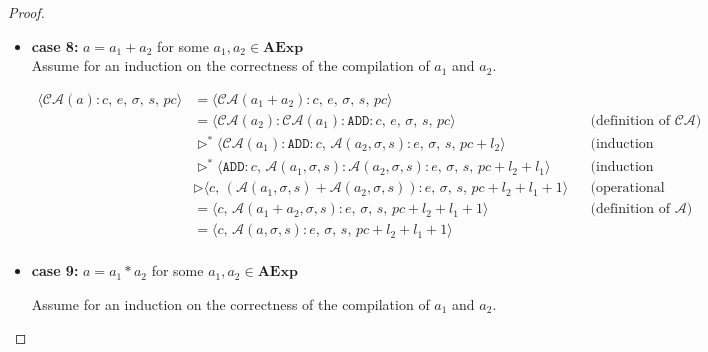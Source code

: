 \documentclass{article}
\begin{document}
\begin{proof}
\begin{itemize}
    \item \textbf{case 8: } $a = a_1 + a_2$ for some $a_1, a_2 \in \textbf{AExp}$ \\

    Assume for an induction on the correctness of the compilation of $a_1$ and $a_2$.

    \[
      \begin{aligned}
        \langle  \mathcal{CA}(a) : c,\, e,\, \sigma,\, s,\, pc \rangle 
        &= \langle \mathcal{CA}(a_1 + a_2) : c,\, e,\, \sigma,\, s,\, pc \rangle \\
        &= \langle \mathcal{CA}(a_2) : \mathcal{CA}(a_1) : \texttt{ADD} :  c,\, e,\, \sigma,\, s,\, pc \rangle 
        && \text{(definition of $\mathcal{CA}$)} \\
        &\triangleright^{\ast} \langle \mathcal{CA}(a_1) : \texttt{ADD} :  c,\, \mathcal{A}(a_2, \sigma, s) : e,\, \sigma,\, s,\, pc + l_2 \rangle 
        && \text{(induction hypothesis 2)} \\
        &\triangleright^{\ast} \langle \texttt{ADD} :  c,\, \mathcal{A}(a_1, \sigma, s) : \mathcal{A}(a_2, \sigma, s) : e,\, \sigma,\, s,\, pc + l_2 + l_1 \rangle 
        && \text{(induction hypothesis 1)} \\
        &\triangleright \langle c,\, (\mathcal{A}(a_1, \sigma, s) + \mathcal{A}(a_2, \sigma, s)) : e,\, \sigma,\, s,\, pc + l_2 + l_1 + 1 \rangle 
        && \text{(operational semantics)} \\
        &= \langle c,\, \mathcal{A}(a_1 + a_2, \sigma, s) : e,\, \sigma,\, s,\, pc + l_2 + l_1 + 1 \rangle
        && \text{(definition of $\mathcal{A}$)} \\
        &= \langle c,\, \mathcal{A}(a, \sigma, s) : e,\, \sigma,\, s,\, pc + l_2 + l_1 + 1 \rangle \\
      \end{aligned}
  \]

    \item \textbf{case 9: } $a = a_1 \ast a_2$ for some $a_1, a_2 \in \textbf{AExp}$

    Assume for an induction on the correctness of the compilation of $a_1$ and $a_2$.


\end{itemize}
\end{proof}
\end{document}
